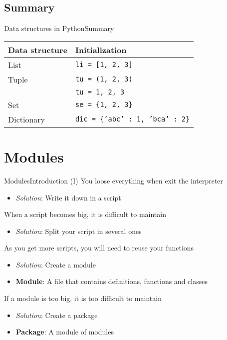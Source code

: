 \documentclass[10pt,compress]{beamer} %
\begin{document}
\subsection{Summary}
\begin{frame}{Data structures in Python}{Summary}
	
\centering \begin{tabular}{l|l}
\hline
\sc Data structure & \sc Initialization  \\\hline
List   & \texttt{li = [1, 2, 3]} \\
Tuple  & \texttt{tu = (1, 2, 3)} \\
	   & \texttt{tu = 1, 2, 3} \\
Set    & \texttt{se = \{1, 2, 3\}} \\
Dictionary& \texttt{dic = \{'abc' : 1, 'bca' : 2\}} \\\hline
\end{tabular}
\end{frame}

\section{Modules}

\begin{frame}{Modules}{Introduction (I)}
		You loose everything when exit the interpreter
			\begin{itemize}
			\item \textit{Solution}: Write it down in a script
			\end{itemize}
		When a script becomes big, it is difficult to maintain
			\begin{itemize}
			\item \textit{Solution}: Split your script in several ones
			\end{itemize}
		As you get more scripts, you will need to reuse your functions
			\begin{itemize}
			\item \textit{Solution}: Create a \alert{module}
			\item \textbf{Module}: A file that contains definitions, functions and classes
			\end{itemize}
		If a module is too big, it is too difficult to maintain
			\begin{itemize}
			\item \textit{Solution}: Create a \alert{package}
			\item \textbf{Package}: A module of modules
			\end{itemize}
\end{frame}
\end{document}
